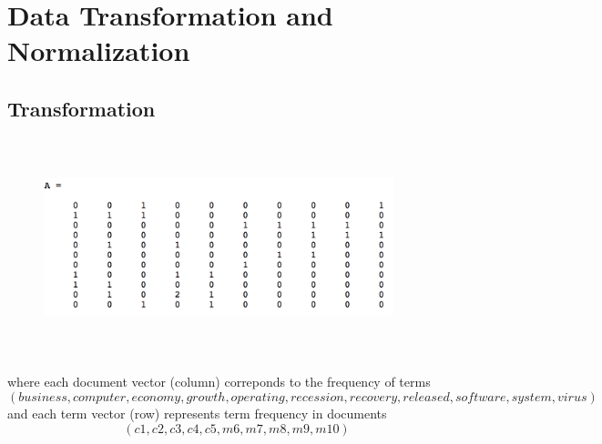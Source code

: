 \documentclass[11pt,a4paper]{article}
\begin{document}
\begin{titlepage}
    \maketitle
\end{titlepage}
\renewcommand{\contentsname}{Contents}
\begin{center} 
    \tableofcontents 
    \listoffigures
\end{center}
\newpage

\section{Data Transformation and Normalization}
\subsection{Transformation}
\begin{figure}[h]
    \centering
\includegraphics[width=4in,height=2.5in]{./A.png} \\
\end{figure}

where each document vector (column) correponds to the frequency of terms 
$$ (business, computer, economy, growth, operating, recession, recovery,
released, software, system, virus) $$
and each term vector (row) represents term frequency in documents
$$ 
(c1, c2, c3, c4, c5, m6, m7, m8, m9, m10)
$$
\end{document}
